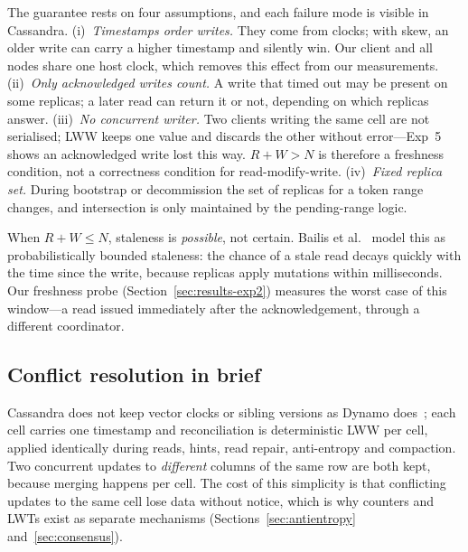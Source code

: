 The guarantee rests on four assumptions, and each failure mode is visible in Cassandra.
(i)~\emph{Timestamps order writes.} They come from clocks; with skew, an older write can
carry a higher timestamp and silently win. Our client and all nodes share one host clock,
which removes this effect from our measurements.
(ii)~\emph{Only acknowledged writes count.} A write that timed out may be present on some
replicas; a later read can return it or not, depending on which replicas answer.
(iii)~\emph{No concurrent writer.} Two clients writing the same cell are not serialised;
LWW keeps one value and discards the other without error---Exp~5 shows an acknowledged
write lost this way. $R + W > N$ is therefore a freshness condition, not a correctness
condition for read-modify-write.
(iv)~\emph{Fixed replica set.} During bootstrap or decommission the set of replicas for a
token range changes, and intersection is only maintained by the pending-range logic.

When $R + W \le N$, staleness is \emph{possible}, not certain. Bailis et
al.~\cite{bailis2012pbs} model this as probabilistically bounded staleness: the chance of a
stale read decays quickly with the time since the write, because replicas apply mutations
within milliseconds. Our freshness probe (Section~\ref{sec:results-exp2}) measures the worst
case of this window---a read issued immediately after the acknowledgement, through a
different coordinator.

\subsection{Conflict resolution in brief}

Cassandra does not keep vector clocks or sibling versions as Dynamo
does~\cite{decandia2007dynamo}; each cell carries one timestamp and reconciliation is
deterministic LWW per cell, applied identically during reads, hints, read repair,
anti-entropy and compaction. Two concurrent updates to \emph{different} columns of the same
row are both kept, because merging happens per cell. The cost of this simplicity is that
conflicting updates to the same cell lose data without notice, which is why counters and
LWTs exist as separate mechanisms (Sections~\ref{sec:antientropy} and~\ref{sec:consensus}).
